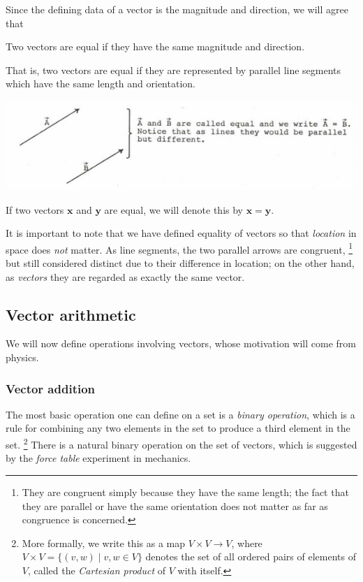 \documentclass[12pt,letterpaper,reqno]{article}
\numberwithin{equation}{section}
\begin{document}
Since the defining data of a vector is the magnitude and direction, we will agree that

\begin{defn}
Two vectors are equal if they have the same magnitude and direction.	
\end{defn}
That is, two vectors are equal if they are represented by parallel line segments which have the same length and orientation. 

\begin{center}
	\includegraphics[scale=0.5]{figures_mvc/equal_vectors_new}
\end{center}
If two vectors $\mathbf{x}$ and $\mathbf{y}$ are equal, we will denote this by $\mathbf{x}=\mathbf{y}$.

It is important to note that we have defined equality of vectors so that \emph{location} in space does \emph{not} matter. As line segments, the two parallel arrows are congruent, \footnote{They are congruent simply because they have the same length; the fact that they are parallel or have the same orientation does not matter as far as congruence is concerned.} but still considered distinct due to their difference in location; on the other hand, as \emph{vectors} they are regarded as exactly the same vector. 

\subsection{Vector arithmetic}
We will now define operations involving vectors, whose motivation will come from physics. 

\subsubsection{Vector addition}
The most basic operation one can define on a set is a \emph{binary operation}, which is a rule for combining any two elements in the set to produce a third element in the set. \footnote{More formally, we write this as a map $V \times V \to V$, where $V \times V=\{(v,w) \mid v,w \in V\}$ denotes the set of all ordered pairs of elements of $V$, called the \emph{Cartesian product} of $V$ with itself.} There is a natural binary operation on the set of vectors, which is suggested by the \emph{force table} experiment in mechanics.
\end{document}
